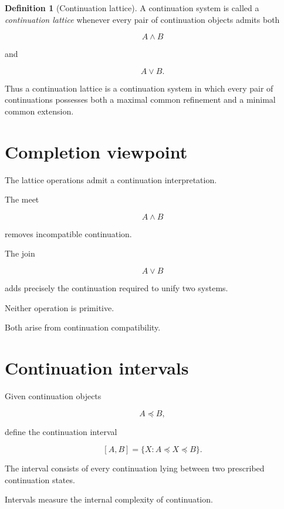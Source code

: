 \documentclass[13pt,openany]{book}
\theoremstyle{plain}
\theoremstyle{definition}
\newtheorem{definition}{Definition}[chapter]
\begin{document}
\begin{definition}[Continuation lattice]
A continuation system is called a
\emph{continuation lattice}
whenever every pair of continuation objects admits both

\[
A\wedge B
\]

and

\[
A\vee B.
\]
\end{definition}

Thus a continuation lattice is a continuation system in which every pair of
continuations possesses both a maximal common refinement and a minimal common
extension.

\section{Completion viewpoint}

The lattice operations admit a continuation interpretation.

The meet

\[
A\wedge B
\]

removes incompatible continuation.

The join

\[
A\vee B
\]

adds precisely the continuation required to unify two systems.

Neither operation is primitive.

Both arise from continuation compatibility.

\section{Continuation intervals}

Given continuation objects

\[
A\preccurlyeq B,
\]

define the continuation interval

\[
[A,B]
=
\{
X:
A\preccurlyeq X\preccurlyeq B
\}.
\]

The interval consists of every continuation lying between two prescribed
continuation states.

Intervals measure the internal complexity of continuation.
\end{document}
